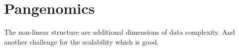 \section{Pangenomics}

The non-linear structure are additional dimensions of data complexity. And
another challenge for the scalability which is good.